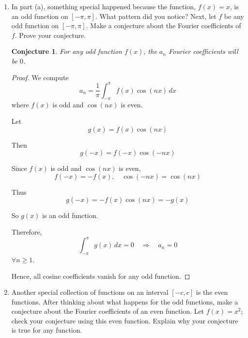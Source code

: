 \documentclass[12pt]{article}
\newtheorem{conj}{Conjecture}
\begin{document}
\begin{enumerate}[label=(\alph*)]
\begin{proof}
    $u$ is what is called a 'dummy variable', so with a re-substitution of our original $x$ and plugging $I_2$ back into the original integral, we get:
    \[I = \int_{0}^{c}f(x)\; \mathrm{d}x + \left(-\int_{0}^{c}f(x)\; \mathrm{d}x\right)\]
    \[= 0\]
    
    \vspace{.1in}
    \[\therefore \int_{-c}^{c}f(x)\; \mathrm{d}x = 0\]
\end{proof}
\item In part (a), something special happened because the function, $f(x) = x$, is an odd function on $[-\pi,\pi]$. What pattern did you notice? Next, let $f$ be any odd function on $[-\pi,\pi]$. Make a conjecture about the Fourier coefficients of $f$. Prove your conjecture.

\begin{conj}
    For any odd function $f(x)$, the $a_n$ Fourier coefficients will be $0$.
\end{conj}
\vspace{.1in}
\begin{proof}
We compute
\[
a_n = \frac{1}{\pi}\int_{-\pi}^{\pi} f(x)\cos(nx)\,dx
\]
where $f(x)$ is odd and $\cos(nx)$ is even.

\vspace{.1in}

Let
\[
g(x)=f(x)\cos(nx)
\]

Then
\[
g(-x)=f(-x)\cos(-nx)
\]

Since $f(x)$ is odd and $\cos(nx)$ is even,
\[
f(-x)=-f(x), \quad \cos(-nx)=\cos(nx)
\]

Thus
\[
g(-x)=-f(x)\cos(nx)=-g(x)
\]

So $g(x)$ is an odd function.

\vspace{.1in}

Therefore,
\[
\int_{-\pi}^{\pi} g(x)\,dx = 0
\quad \Rightarrow \quad
a_n = 0
\] 
$ \forall n \geq 1$.


\vspace{.1in}

Hence, all cosine coefficients vanish for any odd function.
\end{proof}


\item Another special collection of functions on an interval $[-c,c]$ is the even functions. After thinking about what happens for the odd functions, make a conjecture about the Fourier coefficients of an even function. Let $f(x) = x^2$; check your conjecture using this even function. Explain why your conjecture is true for any function.


\end{enumerate}
\end{document}
